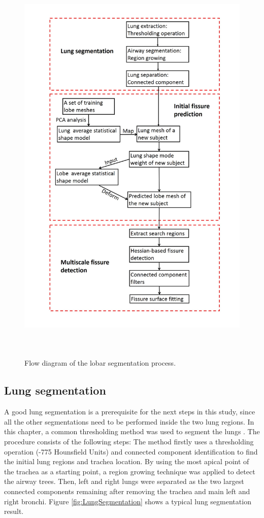 \begin{figure}[H]
  \centering 
  \includegraphics[height=7.8in]{Segmentation/Image/WholeWorkflow.jpg}
  \caption{Flow diagram of the lobar segmentation process.}
  \label{fig:WholeWorkflow}
\end{figure}

\subsection{Lung segmentation} \label{subsection:LungSegmentation}
A good lung segmentation is a prerequisite for the next steps in this study, since all the other segmentations need to be performed inside the two lung regions. In this chapter, a common thresholding method was used to segment the lungs \citep{ukil2005smoothing}. The procedure consists of the following steps: The method firstly uses a thresholding operation (-775 Hounsfield Units) and connected component identification to find the initial lung regions and trachea location. By using the most apical point of the trachea as a starting point, a region growing technique was applied to detect the airway trees. Then, left and right lungs were separated as the two largest connected components remaining after removing the trachea and main left and right bronchi. Figure \ref{fig:LungSegmentation} shows a typical lung segmentation result.


